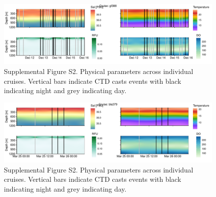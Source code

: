 \documentclass[
]{article}
\begin{document}
\begin{figure}

{\centering \includegraphics[width=1\textwidth,height=\textheight]{index_files/figure-pdf/unnamed-chunk-19-18.pdf}

}

\caption{Supplemental Figure S2. Physical parameters across individual
cruises. Vertical bars indicate CTD casts events with black indicating
night and grey indicating day.}

\end{figure}

\begin{figure}

{\centering \includegraphics[width=1\textwidth,height=\textheight]{index_files/figure-pdf/unnamed-chunk-19-19.pdf}

}

\caption{Supplemental Figure S2. Physical parameters across individual
cruises. Vertical bars indicate CTD casts events with black indicating
night and grey indicating day.}

\end{figure}
\end{document}
